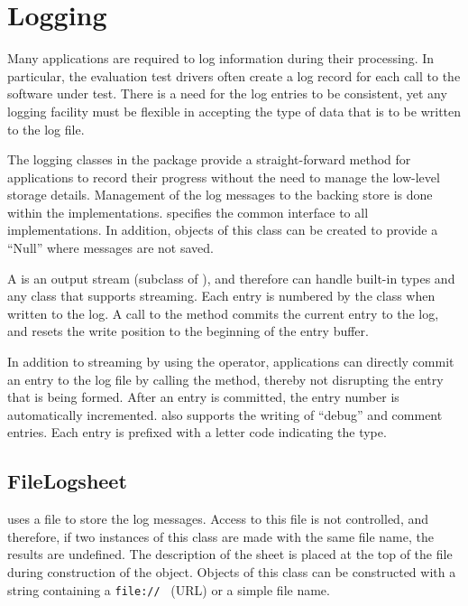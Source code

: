 \section{Logging}
\label{sec-logging}

Many applications are required to log information during their processing. In
particular, the evaluation test drivers often create a log record for each
call to the software under test. There is a need for the log entries to be
consistent, yet any logging facility must be flexible in accepting the type of
data that is to be written to the log file.

The logging classes in the  package provide a straight-forward
method for applications to record their progress without the need to manage the
low-level storage details. Management of the log messages to the backing store
is done within the  implementations.  specifies
the common interface to all implementations. In addition, objects of this class
can be created to provide a ``Null''  where messages are
not saved.

A  is an output stream (subclass of ),
and therefore can handle built-in types and any class that supports streaming.
Each entry is numbered by the  class when written to the log.
A call to the
 method commits the current entry to the log, and
resets the write position to the beginning of the entry buffer.


In addition to streaming by using the  operator, 
applications can directly commit an entry to the log file by calling the 
 method, thereby not disrupting the entry that is being formed.
After an entry is committed, the entry number is automatically incremented.
 also supports the writing of ``debug'' and comment entries.
Each entry is prefixed with a letter code indicating the type.

\subsection{FileLogsheet}
\label{sec-filelogsheet}

 uses a file to store the log messages. Access to this
file is not controlled, and therefore, if two instances of this class
are made with the same file name, the results are undefined. 
The description of the sheet is placed at the top of the file during
construction of the object. Objects of this class can be constructed with
a string containing a \verb=file://= \URL~(URL) or a simple file name.

